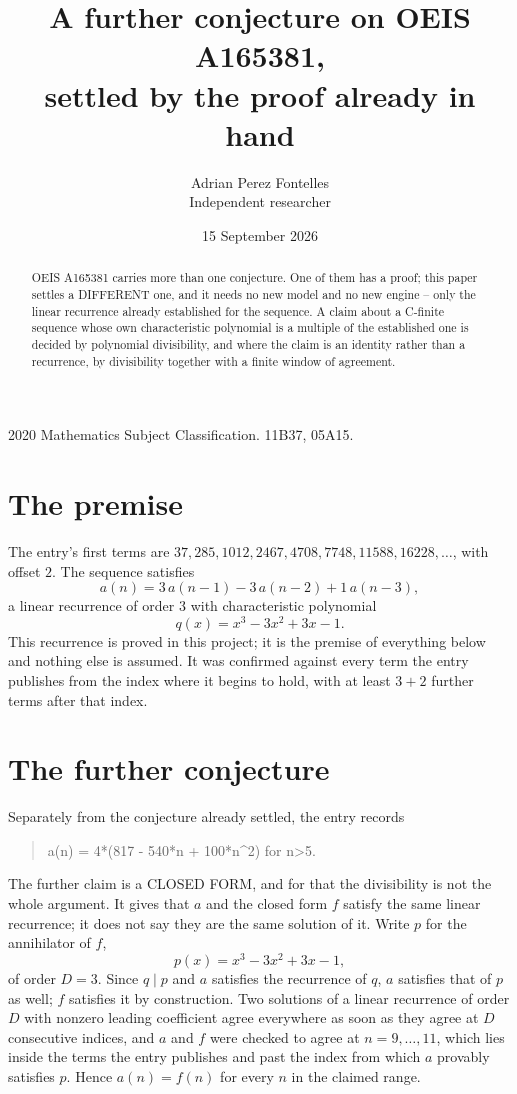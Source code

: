 \documentclass[11pt,a4paper]{article}
\title{A further conjecture on OEIS A165381,\\ \large settled by the proof already in hand}
\author{Adrian Perez Fontelles\\ \small Independent researcher}
\date{15 September 2026}
\theoremstyle{plain}
\theoremstyle{definition}
\begin{document}
\maketitle

\begin{abstract}
OEIS A165381 carries more than one conjecture. One of them has a proof; this paper settles a
DIFFERENT one, and it needs no new model and no new engine -- only the linear recurrence already
established for the sequence. A claim about a C-finite sequence whose own characteristic
polynomial is a multiple of the established one is decided by polynomial divisibility, and where
the claim is an identity rather than a recurrence, by divisibility together with a finite window
of agreement.
\end{abstract}

\noindent\small 2020 Mathematics Subject Classification. 11B37, 05A15.\normalsize

\section{The premise}

The entry's first terms are $37, 285, 1012, 2467, 4708, 7748, 11588, 16228,\dots$, with offset $2$. The sequence satisfies
\[
  a(n)=3\,a(n-1) - 3\,a(n-2) + 1\,a(n-3) ,
\]
a linear recurrence of order $3$ with characteristic polynomial
\[
  q(x)=x^{3} - 3 x^{2} + 3 x - 1 .
\]
This recurrence is proved in this project; it is the premise of everything below and nothing else is assumed.
It was confirmed against every term the entry publishes from the index where it begins to hold,
with at least $3+2$ further terms after that index.

\section{The further conjecture}

Separately from the conjecture already settled, the entry records

\begin{quote}\raggedright a(n) = 4*(817 - 540*n + 100*n\^{}2) for n>5.\end{quote}

The further claim is a CLOSED FORM, and for that the divisibility is not the whole argument. It
gives that $a$ and the closed form $f$ satisfy the same linear recurrence; it does not say they
are the same solution of it. Write $p$ for the annihilator of $f$,
\[
  p(x)=x^{3} - 3 x^{2} + 3 x - 1 ,
\]
of order $D=3$. Since $q\mid p$ and $a$ satisfies the recurrence of $q$, $a$ satisfies that of
$p$ as well; $f$ satisfies it by construction. Two solutions of a linear recurrence of order $D$
with nonzero leading coefficient agree everywhere as soon as they agree at $D$ consecutive
indices, and $a$ and $f$ were checked to agree at $n=9,\dots,11$,
which lies inside the terms the entry publishes and past the index from which $a$ provably
satisfies $p$. Hence $a(n)=f(n)$ for every $n$ in the claimed range.
\end{document}
